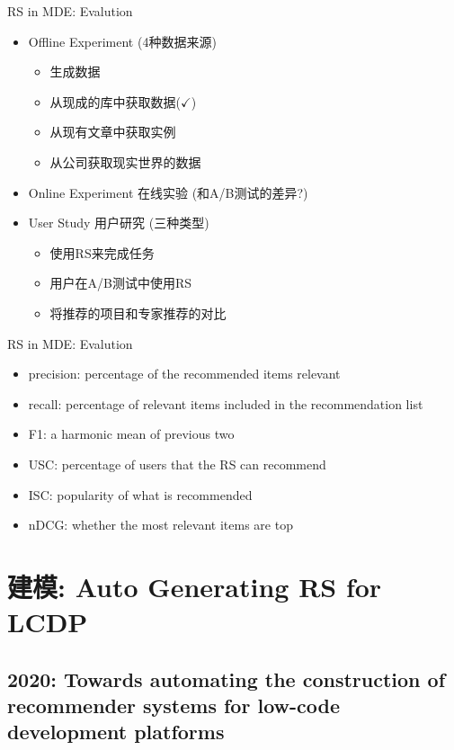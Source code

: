 \documentclass{beamer}
\begin{document}
\begin{frame}{RS in MDE: Evalution}
    \begin{itemize}
        \item Offline Experiment (4种数据来源)
        \begin{itemize}
            \item 生成数据
            \item 从现成的库中获取数据($\checkmark$)
            \item 从现有文章中获取实例
            \item 从公司获取现实世界的数据
        \end{itemize}
        \item Online Experiment 在线实验 (和A/B测试的差异?)
        \item User Study 用户研究 (三种类型)
        \begin{itemize}
            \item 使用RS来完成任务
            \item 用户在A/B测试中使用RS
            \item 将推荐的项目和专家推荐的对比
        \end{itemize}
    \end{itemize}
\end{frame}
\begin{frame}{RS in MDE: Evalution}
    \begin{itemize}
        \item precision: percentage of the recommended items relevant
        \item recall: percentage of relevant items included in the recommendation list
        \item F1: a harmonic mean of previous two
        \item USC: percentage of users that the RS can recommend
        \item ISC: popularity of what is recommended
        \item nDCG: whether the most relevant items are top
    \end{itemize}
\end{frame}


\section{建模: Auto Generating RS for LCDP}
\subsection{2020: Towards automating the construction of recommender systems for low-code development platforms}
\end{document}
